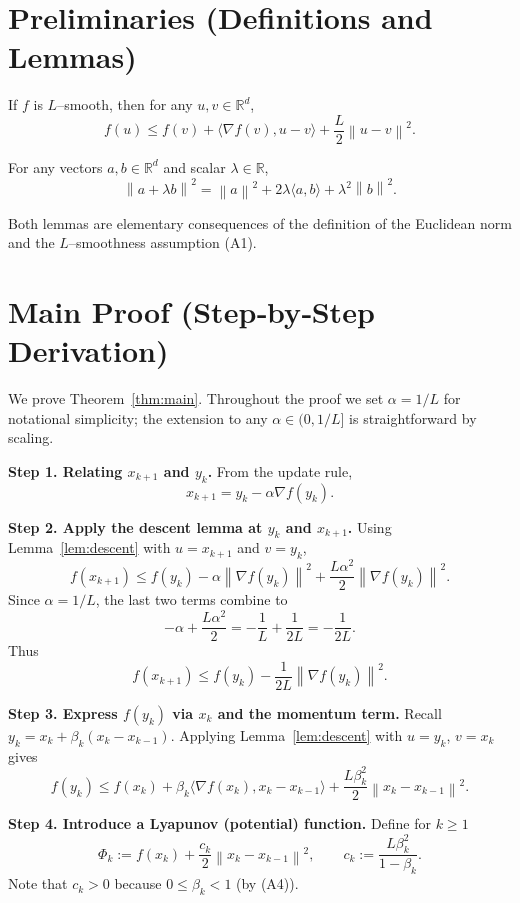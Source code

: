 \documentclass{article}
\newcommand{\norm}[1]{\left\lVert#1\right\rVert}
\newcommand{\grad}{\nabla}
\begin{document}
\section*{Preliminaries (Definitions and Lemmas)}
\begin{lemma}\label{lem:descent}
If $f$ is $L$–smooth, then for any $u,v\in\mathbb{R}^d$,
\[
f(u)\le f(v)+\langle\grad f(v),u-v\rangle+\frac{L}{2}\norm{u-v}^2 .
\]
\end{lemma}
\begin{lemma}\label{lem:quad}
For any vectors $a,b\in\mathbb{R}^d$ and scalar $\lambda\in\mathbb{R}$,
\[
\norm{a+\lambda b}^2 = \norm{a}^2 + 2\lambda\langle a,b\rangle + \lambda^2\norm{b}^2 .
\]
\end{lemma}
Both lemmas are elementary consequences of the definition of the Euclidean
norm and the $L$–smoothness assumption (A1).

\section*{Main Proof (Step‑by‑Step Derivation)}
We prove Theorem~\ref{thm:main}.  Throughout the proof we set $\alpha=1/L$
for notational simplicity; the extension to any $\alpha\in(0,1/L]$ is
straightforward by scaling.

\noindent\textbf{Step 1.  Relating $x_{k+1}$ and $y_k$.}  
From the update rule,
\[
x_{k+1}=y_k-\alpha\grad f(y_k).
\tag{3}
\]

\noindent\textbf{Step 2.  Apply the descent lemma at $y_k$ and $x_{k+1}$.}  
Using Lemma~\ref{lem:descent} with $u=x_{k+1}$ and $v=y_k$,
\[
f(x_{k+1})\le f(y_k)-\alpha\norm{\grad f(y_k)}^2
               +\frac{L\alpha^{2}}{2}\norm{\grad f(y_k)}^2 .
\tag{4}
\]
Since $\alpha=1/L$, the last two terms combine to
\[
-\alpha+\frac{L\alpha^{2}}{2}= -\frac{1}{L}+\frac{1}{2L}= -\frac{1}{2L}.
\]
Thus
\[
f(x_{k+1})\le f(y_k)-\frac{1}{2L}\norm{\grad f(y_k)}^{2}.
\tag{5}
\]

\noindent\textbf{Step 3.  Express $f(y_k)$ via $x_k$ and the momentum term.}  
Recall $y_k = x_k+\beta_k (x_k-x_{k-1})$.  Applying Lemma~\ref{lem:descent}
with $u=y_k$, $v=x_k$ gives
\[
f(y_k)\le f(x_k)+\beta_k\langle\grad f(x_k),x_k-x_{k-1}\rangle
        +\frac{L\beta_k^{2}}{2}\norm{x_k-x_{k-1}}^{2}.
\tag{6}
\]

\noindent\textbf{Step 4.  Introduce a Lyapunov (potential) function.}  
Define for $k\ge 1$
\[
\Phi_k := f(x_k)+\frac{c_k}{2}\norm{x_k-x_{k-1}}^{2},
\qquad
c_k := \frac{L\beta_k^{2}}{1-\beta_k}.
\tag{7}
\]
Note that $c_k>0$ because $0\le\beta_k<1$ (by (A4)).
\end{document}
